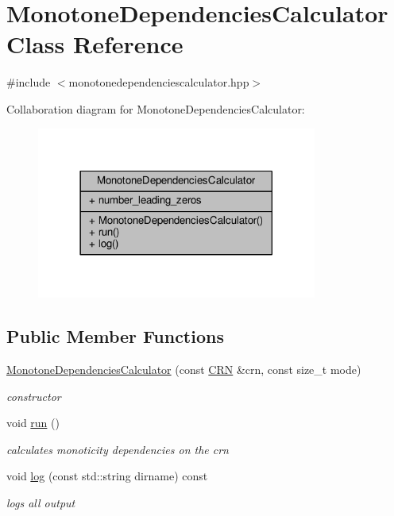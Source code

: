 \hypertarget{classMonotoneDependenciesCalculator}{}\section{Monotone\+Dependencies\+Calculator Class Reference}
\label{classMonotoneDependenciesCalculator}


{\ttfamily \#include $<$monotonedependenciescalculator.\+hpp$>$}



Collaboration diagram for Monotone\+Dependencies\+Calculator\+:
\nopagebreak
\begin{figure}[H]
\begin{center}
\leavevmode
\includegraphics[width=261pt]{classMonotoneDependenciesCalculator__coll__graph}
\end{center}
\end{figure}
\subsection*{Public Member Functions}
\begin{DoxyCompactItemize}
\item 
\mbox{\hyperlink{classMonotoneDependenciesCalculator_ad34f416980b165442b9b80b75d9589db}{Monotone\+Dependencies\+Calculator}} (const \mbox{\hyperlink{classCRN}{C\+RN}} \&crn, const size\+\_\+t mode)
\begin{DoxyCompactList}\small\item\em constructor \end{DoxyCompactList}\item 
void \mbox{\hyperlink{classMonotoneDependenciesCalculator_addefd7e4a175dc984f466ab59f9827b6}{run}} ()
\begin{DoxyCompactList}\small\item\em calculates monoticity dependencies on the crn \end{DoxyCompactList}\item 
void \mbox{\hyperlink{classMonotoneDependenciesCalculator_ab848f6a0f7330fb11e18f13554a82152}{log}} (const std\+::string dirname) const
\begin{DoxyCompactList}\small\item\em logs all output \end{DoxyCompactList}\end{DoxyCompactItemize}
